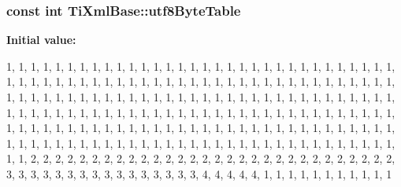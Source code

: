 \hypertarget{class_ti_xml_base_ac8c86058137bdb4b413c3eca58f2d467}{
\subsubsection[{utf8\-Byte\-Table}]{\setlength{\rightskip}{0pt plus 5cm}const int \-Ti\-Xml\-Base\-::utf8\-Byte\-Table}}\label{class_ti_xml_base_ac8c86058137bdb4b413c3eca58f2d467}
{\bfseries \-Initial value\-:}
\begin{DoxyCode}
 
{
        
                1,      1,      1,      1,      1,      1,      1,      1,      
      1,       1,      1,      1,      1,      1,      1,      1,      
                1,      1,      1,      1,      1,      1,      1,      1,      
      1,       1,      1,      1,      1,      1,      1,      1,      
                1,      1,      1,      1,      1,      1,      1,      1,      
      1,       1,      1,      1,      1,      1,      1,      1,      
                1,      1,      1,      1,      1,      1,      1,      1,      
      1,       1,      1,      1,      1,      1,      1,      1,      
                1,      1,      1,      1,      1,      1,      1,      1,      
      1,       1,      1,      1,      1,      1,      1,      1,      
                1,      1,      1,      1,      1,      1,      1,      1,      
      1,       1,      1,      1,      1,      1,      1,      1,      
                1,      1,      1,      1,      1,      1,      1,      1,      
      1,       1,      1,      1,      1,      1,      1,      1,      
                1,      1,      1,      1,      1,      1,      1,      1,      
      1,       1,      1,      1,      1,      1,      1,      1,      
                1,      1,      1,      1,      1,      1,      1,      1,      
      1,       1,      1,      1,      1,      1,      1,      1,      
                1,      1,      1,      1,      1,      1,      1,      1,      
      1,       1,      1,      1,      1,      1,      1,      1,      
                1,      1,      1,      1,      1,      1,      1,      1,      
      1,       1,      1,      1,      1,      1,      1,      1,      
                1,      1,      1,      1,      1,      1,      1,      1,      
      1,       1,      1,      1,      1,      1,      1,      1,      
                1,      1,      2,      2,      2,      2,      2,      2,      
      2,       2,      2,      2,      2,      2,      2,      2,      
                2,      2,      2,      2,      2,      2,      2,      2,      
      2,       2,      2,      2,      2,      2,      2,      2,      
                3,      3,      3,      3,      3,      3,      3,      3,      
      3,       3,      3,      3,      3,      3,      3,      3,      
                4,      4,      4,      4,      4,      1,      1,      1,      
      1,       1,      1,      1,      1,      1,      1,      1       
}
\end{DoxyCode}


